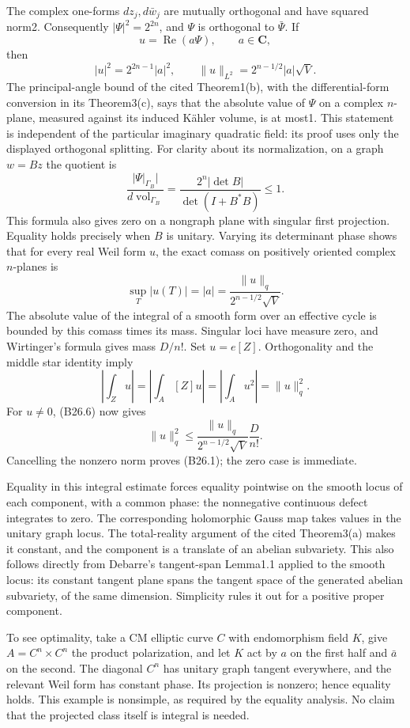 \documentclass[11pt,a4paper]{article}
\theoremstyle{definition}
\begin{document}
The complex one-forms \(dz_j,d\bar w_j\) are mutually orthogonal and have squared norm2. Consequently \(|\Psi|^2=2^{2n}\), and \(\Psi\) is orthogonal to \(\bar\Psi\). If \[
 u=\operatorname{Re}(a\Psi),\qquad a\in\mathbf C,
\] then \[
 |u|^2=2^{2n-1}|a|^2,
 \qquad \|u\|_{L^2}=2^{n-1/2}|a|\sqrt V.
 \tag{B26.4}
\] The principal-angle bound of the cited Theorem1(b), with the differential-form conversion in its Theorem3(c), says that the absolute value of \(\Psi\) on a complex \(n\)-plane, measured against its induced Kähler volume, is at most1. This statement is independent of the particular imaginary quadratic field: its proof uses only the displayed orthogonal splitting. For clarity about its normalization, on a graph \(w=Bz\) the quotient is \[
 \frac{|\Psi|_{\Gamma_B}|}{d\operatorname{vol}_{\Gamma_B}}
 =\frac{2^n|\det B|}{\det(I+B^*B)}\le1.
 \tag{B26.5}
\] This formula also gives zero on a nongraph plane with singular first projection. Equality holds precisely when \(B\) is unitary. Varying its determinant phase shows that for every real Weil form \(u\), the exact comass on positively oriented complex \(n\)-planes is \[
 \sup_T|u(T)|=|a|=
 \frac{\|u\|_q}{2^{n-1/2}\sqrt V}.
 \tag{B26.6}
\] The absolute value of the integral of a smooth form over an effective cycle is bounded by this comass times its mass. Singular loci have measure zero, and Wirtinger's formula gives mass \(D/n!\). Set \(u=e[Z]\). Orthogonality and the middle star identity imply \[
 \left|\int_Zu\right|
 =\left|\int_A[Z]u\right|
 =\left|\int_Au^2\right|=\|u\|_q^2.
\] For \(u\ne0\), (B26.6) now gives \[
 \|u\|_q^2\le
 \frac{\|u\|_q}{2^{n-1/2}\sqrt V}\frac D{n!}.
\] Cancelling the nonzero norm proves (B26.1); the zero case is immediate.

Equality in this integral estimate forces equality pointwise on the smooth locus of each component, with a common phase: the nonnegative continuous defect integrates to zero. The corresponding holomorphic Gauss map takes values in the unitary graph locus. The total-reality argument of the cited Theorem3(a) makes it constant, and the component is a translate of an abelian subvariety. This also follows directly from Debarre's tangent-span Lemma1.1 applied to the smooth locus: its constant tangent plane spans the tangent space of the generated abelian subvariety, of the same dimension. Simplicity rules it out for a positive proper component.

To see optimality, take a CM elliptic curve \(C\) with endomorphism field \(K\), give \(A=C^n\times C^n\) the product polarization, and let \(K\) act by \(a\) on the first half and \(\bar a\) on the second. The diagonal \(C^n\) has unitary graph tangent everywhere, and the relevant Weil form has constant phase. Its projection is nonzero; hence equality holds. This example is nonsimple, as required by the equality analysis. No claim that the projected class itself is integral is needed.
\end{document}
